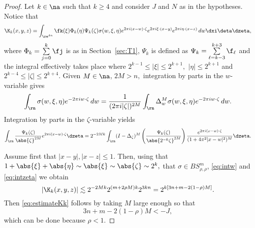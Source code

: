 \begin{proof} Let $k\in\na$ such that $k\ge 4$ and consider $J$ and $N$ as in the hypotheses. Notice that 
\begin{align*}
 \K_k(x,y,z) = \int_{\re^{4n}} \fk(\xi) \Phi_k(\eta) \Psi_k(\zeta) \sigma(w, \xi, \eta) e^{2\pi i (x-w) \cdot \zeta} e^{2\pi i \xi \cdot( x- y)} e^{2\pi i \eta \cdot(x-z)} \, dw \dxi \deta  \dzeta,
\end{align*}
where $\Phi_k= \sum\limits_{j=0}^k \fj$  is as in Section~\ref{sec:T1},  $\Psi_k$ is defined as $\Psi_k= \sum\limits_{\ell =k-3}^{k+3}\f_\ell$  and the integral effectively takes place where $2^{k-1} \leq |\xi| \leq 2^{k+1},$   $|\eta| \leq 2^{k+1}$ and  $2^{k-4} \leq |\zeta| \leq 2^{k+4}$. Given $M \in \na$, $2M>n,$ integration by parts in the $w$-variable gives 
\begin{equation}\label{eq:intw}
\int_{\rn} \sigma(w, \xi, \eta) e^{-2\pi i w \cdot \zeta} \, dw =  \frac{1}{(2\pi i|\zeta|)^{2M}} \int_{\rn} \Delta_w^M \sigma(w, \xi, \eta) e^{-2\pi i w \cdot \zeta} \, dw.
\end{equation}
  Integration by parts in the $\zeta$-variable yields
\begin{equation}\label{eq:intzeta}
\int_{\rn}  \frac{\Psi_k(\zeta)}{\abs{\zeta}^{2M}} e^{2\pi i (x-w) \cdot \zeta} \dzeta = 2^{-2Mk}\int_{\rn} (I - \Delta_\zeta)^M \left(\frac{\Psi_k(\zeta)}{\abs{2^{-k}\zeta}^{2M}}\right)  \frac{e^{2\pi i (x-w) \cdot \zeta}}{(1 + 4\pi^2|x - w|^2)^M} \dzeta.
\end{equation}

Assume first that $|x-y|, |x-z| \leq 1$. Then, using that  $1+\abs{\xi}+\abs{\eta}\sim \abs{\xi}\sim \abs{\zeta} \sim 2^k,$ that $\sigma \in BS^m_{\rho, \rho}$,  \eqref{eq:intw} and \eqref{eq:intzeta} we obtain
$$
|\K_k(x,y,z)| \lesssim 2^{-2Mk} 2^{(m+ 2\rho M) k} 2^{3kn} = 2^{k [3n + m - 2 (1-\rho) M]}.
$$
 Then \eqref{eq:estimateKk} follows by taking $M$ large enough so that
\begin{equation}\label{cond:M:J}
3n +m- 2 (1-\rho)M < - J,
\end{equation}
which can be done because $\rho < 1$.


\end{proof}
